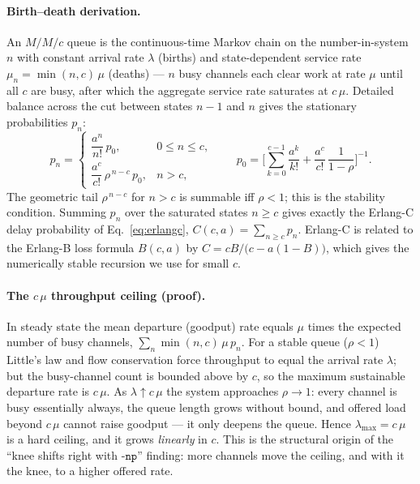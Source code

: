 \documentclass[11pt,a4paper]{article}
\begin{document}
\paragraph{Birth--death derivation.} An \(M/M/c\) queue is the continuous-time
Markov chain on the number-in-system \(n\) with constant arrival rate \(\lambda\)
(births) and state-dependent service rate \(\mu_n = \min(n,c)\,\mu\) (deaths) ---
\(n\) busy channels each clear work at rate \(\mu\) until all \(c\) are busy,
after which the aggregate service rate saturates at \(c\,\mu\). Detailed balance
across the cut between states \(n-1\) and \(n\) gives the stationary
probabilities \(p_n\):
\begin{equation}
  p_n =
  \begin{cases}
    \dfrac{a^{n}}{n!}\,p_0, & 0 \le n \le c,\\[6pt]
    \dfrac{a^{c}}{c!}\,\rho^{\,n-c}\,p_0, & n > c,
  \end{cases}
  \qquad
  p_0 = \Bigg[\sum_{k=0}^{c-1}\frac{a^{k}}{k!}
        + \frac{a^{c}}{c!}\,\frac{1}{1-\rho}\Bigg]^{-1}.
  \label{eq:stationary}
\end{equation}
The geometric tail \(\rho^{\,n-c}\) for \(n>c\) is summable iff \(\rho<1\); this
is the stability condition. Summing \(p_n\) over the saturated states
\(n\ge c\) gives exactly the Erlang-C delay probability of
Eq.~\eqref{eq:erlangc}, \(C(c,a)=\sum_{n\ge c}p_n\). Erlang-C is related to the
Erlang-B loss formula \(B(c,a)\) \citep{erlangb1948} by
\(C = cB/\big(c-a(1-B)\big)\), which gives the numerically stable recursion we
use for small \(c\).

\paragraph{The \(c\,\mu\) throughput ceiling (proof).} In steady state the mean
departure (goodput) rate equals \(\mu\) times the expected number of busy
channels, \(\sum_n \min(n,c)\,\mu\,p_n\). For a stable queue (\(\rho<1\)) Little's
law and flow conservation force throughput to equal the arrival rate
\(\lambda\); but the busy-channel count is bounded above by \(c\), so the maximum
sustainable departure rate is \(c\,\mu\). As \(\lambda\uparrow c\,\mu\) the system
approaches \(\rho\to1\): every channel is busy essentially always, the queue
length grows without bound, and offered load beyond \(c\,\mu\) cannot raise
goodput --- it only deepens the queue. Hence \(\lambda_{\max}=c\,\mu\) is a hard
ceiling, and it grows \emph{linearly} in \(c\). This is the structural origin of
the ``knee shifts right with \(\texttt{-np}\)'' finding: more channels move the
ceiling, and with it the knee, to a higher offered rate.
\end{document}
